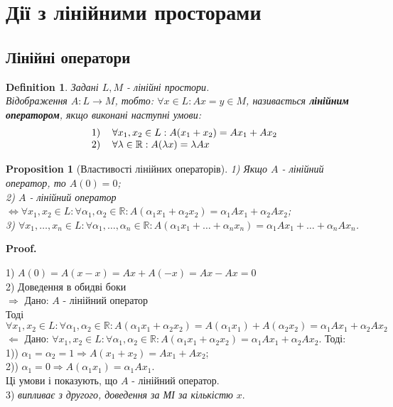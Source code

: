 \documentclass[a4paper, 10pt]{article}
\makeatletter
\def\rightproof{$\boxed{\Rightarrow}$ }
\def\leftproof{$\boxed{\Leftarrow}$ }
\theoremstyle{theoremdd}
\newtheorem{definition}[theorem]{Definition}
\newtheorem{proposition}[theorem]{Proposition}
\renewenvironment{proof}[1][Proof.\\]{\par
\pushQED{\hfill \qed}%
\normalfont \topsep6\p@\@plus6\p@\relax
\trivlist
\item\relax
{\bfseries
#1\@addpunct{.}}\hspace\labelsep\ignorespaces
}{%
\popQED\endtrivlist\@endpefalse
}
\makeatother
\begin{document}
	
	\section{Дії з лінійними просторами}
	\subsection{Лінійні оператори}
	\begin{definition}
	Задані $L,M$ - лінійні простори.\\
	Відображення $A: L \to M$, тобто: $\forall x \in L: Ax=y \in M$, називається \textbf{лінійним оператором}, якщо виконані наступні умови:
	\begin{align*}
	\begin{tabular}{cl}
	1) & $\forall x_1,x_2 \in L: A(x_1+x_2)=Ax_1+Ax_2$\\
	2) & $\forall \lambda \in \mathbb{R}: A(\lambda x) = \lambda Ax$
	\end{tabular}
	\end{align*}
	\end{definition}
	
	\begin{proposition}[Властивості лінійних операторів]
	1) Якщо $A$ - лінійний оператор, то $A(0) = 0$;\\
	2) $A$ - лінійний оператор $\iff \forall x_1,x_2 \in L: \forall \alpha_1, \alpha_2 \in \mathbb{R}: A(\alpha_1 x_1 + \alpha_2 x_2) = \alpha_1 Ax_1 + \alpha_2 Ax_2$;\\
	3) $\forall x_1,\dots, x_n \in L: \forall \alpha_1, \dots, \alpha_n \in \mathbb{R}: A(\alpha_1 x_1 + \dots + \alpha_n x_n) = \alpha_1 Ax_1 + \dots + \alpha_n Ax_n$.
	\end{proposition}
	
	\begin{proof}
	1) $A(0) = A(x - x) = Ax + A(-x) = Ax - Ax = 0$ \bigskip \\
	2) Доведення в обидві боки\\
	\rightproof Дано: $A$ - лінійний оператор\\
	Тоді $\forall x_1,x_2 \in L: \forall \alpha_1, \alpha_2 \in \mathbb{R}: A(\alpha_1 x_1 + \alpha_2 x_2) = A(\alpha_1 x_1) + A(\alpha_2 x_2) = \alpha_1 Ax_1 + \alpha_2 Ax_2$
	\bigskip \\
	\leftproof Дано: $\forall x_1,x_2 \in L: \forall \alpha_1, \alpha_2 \in \mathbb{R}: A(\alpha_1 x_1 + \alpha_2 x_2) = \alpha_1 Ax_1 + \alpha_2 Ax_2$. Тоді:\\
	1)) $\alpha_1 = \alpha_2 = 1 \Rightarrow A(x_1 + x_2) = Ax_1 + Ax_2$;\\
	2)) $\alpha_1 = 0 \Rightarrow A(\alpha_1 x_1) = \alpha_1 Ax_1$.\\
	Ці умови і показують, що $A$ - лінійний оператор. \bigskip \\
	3) \textit{випливає з другого, доведення за МІ за кількістю} $x$.
	\end{proof}
	
\end{document}
